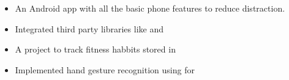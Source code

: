 \begin{itemize}
    \item An Android app with all the basic phone features to reduce distraction.
    \item Integrated third party libraries like and 
 \end{itemize}
 \begin{itemize}
    \item A project to track fitness habbits stored in 
\end{itemize}
\begin{itemize}
   \item Implemented hand gesture recognition using for 
\end{itemize}